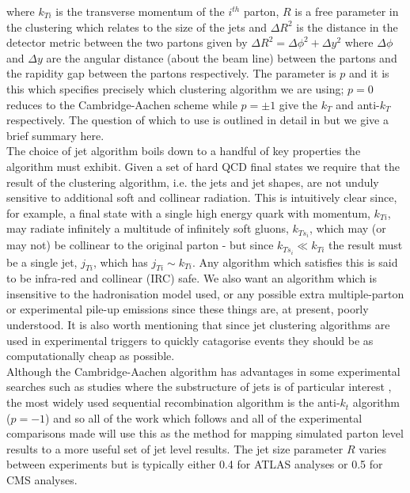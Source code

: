 	where $k_{Ti}$ is the transverse momentum of the $i^{th}$ parton, $R$ is a free parameter in the clustering which relates
	to the size of the jets and $\Delta R^2$ is the distance in the detector metric between the two partons given by
	$\Delta R^2 = \Delta\phi^2 + \Delta y^2$ where $\Delta\phi$ and $\Delta y$ are the angular distance (about the beam line)
	between the partons and the rapidity gap between the partons respectively.  The parameter is $p$ and it is this which
	specifies precisely which clustering algorithm we are using; $p=0$ reduces to the Cambridge-Aachen scheme while
	$p=\pm1$ give the $k_T$ and anti-$k_T$ respectively.  The question of which to use is outlined in detail in
	\cite{Cacciari:2008gp} but we give a brief summary here.\\The choice of jet algorithm boils down to a handful of key
	properties the algorithm must exhibit.  Given a set of hard QCD final states we require that the result of the
	clustering algorithm, i.e. the jets and jet shapes, are not unduly sensitive to additional soft and collinear radiation.
	This is intuitively clear since, for example, a final state with a single high energy quark with momentum, $k_{Ti}$,
	may radiate infinitely a multitude of infinitely soft gluons, $k_{Ts_i}$, which may (or may not) be collinear to the
	original parton - but since $k_{Ts_i}\ll k_{Ti}$ the result must be a single jet, $j_{Ti}$, which has $j_{Ti}\sim k_{Ti}$.
	Any algorithm which satisfies this is said to be infra-red and collinear (IRC) safe.  We also want an algorithm which
	is insensitive to the hadronisation model used, or any possible extra multiple-parton or experimental pile-up emissions
	since these things are, at present, poorly understood.  It is also worth mentioning that since jet clustering algorithms
	are used in experimental triggers to quickly catagorise events they should be as computationally cheap as possible.\\Although
	the Cambridge-Aachen algorithm has advantages in some experimental searches such as studies where the substructure of
	jets is of particular interest \cite{Butterworth:2008iy, Aad:2015owa}, the most widely used sequential recombination algorithm is
	the anti-$k_t$ algorithm ($p=-1$) and so all of the work which follows and all of the experimental comparisons made will
	use this as the method for mapping simulated parton level results to a more useful set of jet level results.  The jet size
	parameter $R$ varies between experiments but is typically either 0.4 for ATLAS analyses or 0.5 for CMS analyses.

